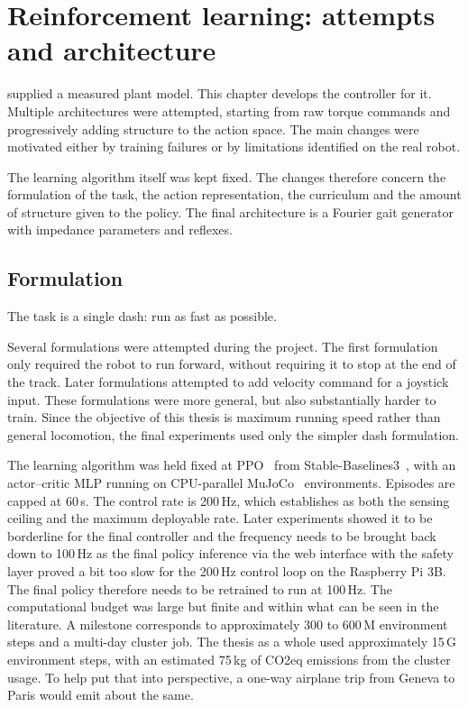 \section{Reinforcement learning: attempts and architecture}

\label{sec:rl}

 supplied a measured plant model.
This chapter develops the controller for it.
Multiple architectures were attempted, starting from raw torque commands and progressively adding structure to the action space.
The main changes were motivated either by training failures or by limitations identified on the real robot.

The learning algorithm itself was kept fixed.
The changes therefore concern the formulation of the task, the action representation, the curriculum and the amount of structure given to the policy.
The final architecture is a Fourier gait generator with impedance parameters and reflexes.

\label{sec:rl-common}

\subsection{Formulation}

The task is a single dash: run as fast as possible.

Several formulations were attempted during the project.
The first formulation only required the robot to run forward, without requiring it to stop at the end of the track.
Later formulations attempted to add velocity command for a joystick input. These formulations were more general, but also substantially harder to train.
Since the objective of this thesis is maximum running speed rather than general locomotion, the final experiments used only the simpler dash formulation.

The learning algorithm was held fixed at PPO~\cite{schulman2017ppo} from Stable-Baselines3~\cite{raffin2021stablebaselines3}, with an actor--critic MLP running on CPU-parallel MuJoCo~\cite{todorov2012mujoco} environments.
Episodes are capped at 60\,s. The control rate is 200\,Hz, which  establishes as both the sensing ceiling and the maximum deployable rate.
Later experiments showed it to be borderline for the final controller and the frequency needs to be brought back down to 100\,Hz as the final policy inference via the web interface with the safety layer proved a bit too slow for the 200\,Hz control loop on the Raspberry Pi 3B. The final policy therefore needs to be retrained to run at 100\,Hz.
The computational budget was large but finite and within what can be seen in the literature.
A milestone corresponds to approximately 300 to 600\,M environment steps and a multi-day cluster job.
The thesis as a whole used approximately 15\,G environment steps, with an estimated 75\,kg of CO2eq emissions from the cluster usage.
To help put that into perspective, a one-way airplane trip from Geneva to Paris would emit about the same.

